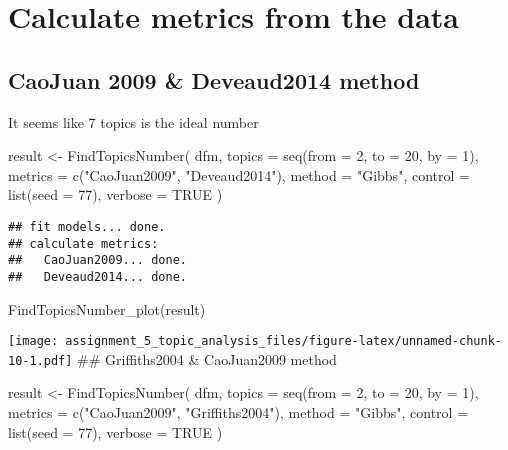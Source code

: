 \documentclass[
]{article}
\newenvironment{Shaded}{\begin{snugshade}}{\end{snugshade}}
\newcommand{\AttributeTok}[1]{\textcolor[rgb]{0.77,0.63,0.00}{#1}}
\newcommand{\ConstantTok}[1]{\textcolor[rgb]{0.00,0.00,0.00}{#1}}
\newcommand{\DecValTok}[1]{\textcolor[rgb]{0.00,0.00,0.81}{#1}}
\newcommand{\FunctionTok}[1]{\textcolor[rgb]{0.00,0.00,0.00}{#1}}
\newcommand{\NormalTok}[1]{#1}
\newcommand{\OtherTok}[1]{\textcolor[rgb]{0.56,0.35,0.01}{#1}}
\newcommand{\StringTok}[1]{\textcolor[rgb]{0.31,0.60,0.02}{#1}}
\begin{document}
\hypertarget{calculate-metrics-from-the-data}{%
\section{Calculate metrics from the
data}\label{calculate-metrics-from-the-data}}

\hypertarget{caojuan-2009-deveaud2014-method}{%
\subsection{CaoJuan 2009 \& Deveaud2014
method}\label{caojuan-2009-deveaud2014-method}}

It seems like 7 topics is the ideal number

\begin{Shaded}
\begin{Highlighting}[]
\NormalTok{result }\OtherTok{\textless{}{-}} \FunctionTok{FindTopicsNumber}\NormalTok{(}
\NormalTok{  dfm,}
  \AttributeTok{topics =} \FunctionTok{seq}\NormalTok{(}\AttributeTok{from =} \DecValTok{2}\NormalTok{, }\AttributeTok{to =} \DecValTok{20}\NormalTok{, }\AttributeTok{by =} \DecValTok{1}\NormalTok{),}
  \AttributeTok{metrics =} \FunctionTok{c}\NormalTok{(}\StringTok{"CaoJuan2009"}\NormalTok{,  }\StringTok{"Deveaud2014"}\NormalTok{),}
  \AttributeTok{method =} \StringTok{"Gibbs"}\NormalTok{,}
  \AttributeTok{control =} \FunctionTok{list}\NormalTok{(}\AttributeTok{seed =} \DecValTok{77}\NormalTok{),}
  \AttributeTok{verbose =} \ConstantTok{TRUE}
\NormalTok{)}
\end{Highlighting}
\end{Shaded}

\begin{verbatim}
## fit models... done.
## calculate metrics:
##   CaoJuan2009... done.
##   Deveaud2014... done.
\end{verbatim}

\begin{Shaded}
\begin{Highlighting}[]
\FunctionTok{FindTopicsNumber\_plot}\NormalTok{(result)}
\end{Highlighting}
\end{Shaded}

\texttt{[image: assignment\_5\_topic\_analysis\_files/figure-latex/unnamed-chunk-10-1.pdf]}
\#\# Griffiths2004 \& CaoJuan2009 method

\begin{Shaded}
\begin{Highlighting}[]
\NormalTok{result }\OtherTok{\textless{}{-}} \FunctionTok{FindTopicsNumber}\NormalTok{(}
\NormalTok{  dfm,}
  \AttributeTok{topics =} \FunctionTok{seq}\NormalTok{(}\AttributeTok{from =} \DecValTok{2}\NormalTok{, }\AttributeTok{to =} \DecValTok{20}\NormalTok{, }\AttributeTok{by =} \DecValTok{1}\NormalTok{),}
  \AttributeTok{metrics =} \FunctionTok{c}\NormalTok{(}\StringTok{"CaoJuan2009"}\NormalTok{, }\StringTok{"Griffiths2004"}\NormalTok{),}
  \AttributeTok{method =} \StringTok{"Gibbs"}\NormalTok{,}
  \AttributeTok{control =} \FunctionTok{list}\NormalTok{(}\AttributeTok{seed =} \DecValTok{77}\NormalTok{),}
  \AttributeTok{verbose =} \ConstantTok{TRUE}
\NormalTok{)}
\end{Highlighting}
\end{Shaded}
\end{document}
